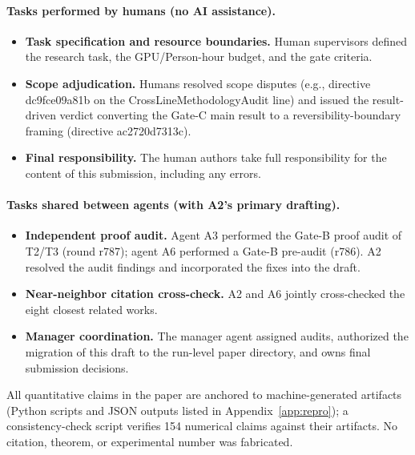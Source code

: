 \paragraph{Tasks performed by humans (no AI assistance).}
\begin{itemize}
  \item \textbf{Task specification and resource boundaries.} Human supervisors
  defined the research task, the GPU/Person-hour budget, and the gate criteria.
  \item \textbf{Scope adjudication.} Humans resolved scope disputes
  (e.g., directive dc9fce09a81b on the CrossLineMethodologyAudit line) and
  issued the result-driven verdict converting the Gate-C main result to a
  reversibility-boundary framing (directive ac2720d7313c).
  \item \textbf{Final responsibility.} The human authors take full
  responsibility for the content of this submission, including any errors.
\end{itemize}

\paragraph{Tasks shared between agents (with A2's primary drafting).}
\begin{itemize}
  \item \textbf{Independent proof audit.} Agent A3 performed the Gate-B proof
  audit of T2/T3 (round r787); agent A6 performed a Gate-B pre-audit (r786).
  A2 resolved the audit findings and incorporated the fixes into the draft.
  \item \textbf{Near-neighbor citation cross-check.} A2 and A6 jointly
  cross-checked the eight closest related works.
  \item \textbf{Manager coordination.} The manager agent assigned audits,
  authorized the migration of this draft to the run-level paper directory, and
  owns final submission decisions.
\end{itemize}

All quantitative claims in the paper are anchored to machine-generated
artifacts (Python scripts and JSON outputs listed in
Appendix~\ref{app:repro}); a consistency-check script verifies 154 numerical
claims against their artifacts. No citation, theorem, or experimental number
was fabricated.
